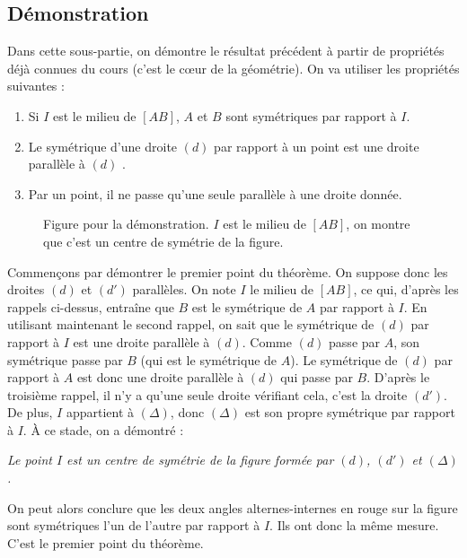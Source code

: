 \documentclass[12 pt]{article}
\theoremstyle{plain}
\newcounter{n}
\numberwithin{n}{section}
\begin{document}
\subsection{Démonstration}
Dans cette sous-partie, on démontre le résultat précédent à partir de propriétés déjà connues du cours (c'est 
le cœur de la géométrie). On va utiliser les propriétés suivantes : \begin{enumerate}
\item Si $I$ est le milieu de $[AB]$, $A$ et $B$ sont symétriques par rapport à $I$. 
\item Le symétrique d'une droite $(d)$ par rapport à un point est une droite parallèle à $(d)$ . 
\item Par un point, il ne passe qu'une seule parallèle à une droite donnée. 
\end{enumerate}
\begin{figure}[H]\center
{}

 \caption{Figure pour la démonstration. $I$ est le milieu de $[AB]$, on montre que c'est un centre
 de symétrie de la figure.}
\end{figure}
Commençons par démontrer le premier point du théorème. On suppose donc les droites $(d)$ et $(d')$ parallèles. 
On note $I$ le milieu de $[AB]$, ce qui, d'après les rappels ci-dessus, entraîne que $B$ est le symétrique de $A$
par rapport à $I$. En utilisant maintenant le second rappel, on sait que le symétrique de $(d)$ par rapport à 
$I$ est une droite parallèle à $(d)$. Comme $(d)$ passe par $A$, son symétrique passe par $B$ (qui est le symétrique
de $A$). Le symétrique de $(d)$ par rapport à $A$ est donc une droite parallèle à $(d)$ qui passe par $B$. D'après le 
troisième rappel, il n'y a qu'une seule droite vérifiant cela, c'est la droite $(d')$. 
De plus, $I$ appartient à $(\Delta)$, donc $(\Delta)$ est son propre symétrique par rapport à $I$. 
À ce stade, on a démontré : 
\begin{center}
\emph{Le point $I$ est un centre de symétrie de la figure formée par $(d)$, $(d')$ et $(\Delta)$.}
\end{center}
On peut alors conclure que les deux angles alternes-internes en rouge sur la figure sont symétriques l'un de
l'autre par rapport à $I$. Ils ont donc la même mesure. C'est le premier point du théorème. 
\end{document}
